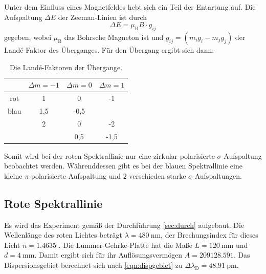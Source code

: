   \noindent
  Unter dem Einfluss eines Magnetfeldes hebt sich ein Teil der Entartung auf. Die Aufspaltung $\Delta E$ der Zeeman-Linien ist durch 
  \begin{equation*}
    \Delta E = \mu_\text{B} B \cdot g_{ij}
  \end{equation*}
  gegeben, wobei $\mu_\text{B}$ das Bohrsche Magneton ist und $g_{ij} = \left(m_ig_i - m_jg_j\right)$ der Land\'{e}-Faktor des Überganges. 
  Für den Übergang ergibt sich dann:
  \begin{table}[H]
    \centering
    \caption{Die Land\'{e}-Faktoren der Übergange.}
    \begin{tabular}{c | c c c }
      \toprule
      {} & {$\Delta m = \num{-1}$} & {$\Delta m = \num{0}$} & {$\Delta m = \num{1}$}\\
      \midrule
      rot & 1 & 0 & -1 \\
      blau & 1,5 & -0,5 & \\
      & 2 & 0 & -2 \\
      &  & 0,5 &-1,5 \\ 
      \bottomrule            
    \end{tabular}
  \end{table}

  \noindent
  Somit wird bei der roten Spektrallinie nur eine zirkular polarisierte $\sigma$-Aufspaltung beobachtet werden. 
  Währenddessen gibt es bei der blauen Spektrallinie eine kleine $\pi$-polarisierte Aufspaltung und $\num{2}$ verschieden starke $\sigma$-Aufspaltungen. 

\subsection{Rote Spektrallinie}

  \noindent Es wird das Experiment gemäß der Durchführung \ref{sec:durch} aufgebaut. Die Wellenlänge des roten Lichtes beträgt 
  $\lambda = \SI{480}{\nano\metre}$, der Brechungsindex für dieses Licht $n = \num{1.4635}$ \cite{V27}. Die Lummer-Gehrke-Platte hat die 
  Maße $L = \SI{120}{\milli\metre}$ und $d = \SI{4}{\milli\metre}$. Damit ergibt sich für ihr Auflösungsvermögen $ A = \num{209128.591}$. 
  Das Dispersionsgebiet berechnet sich nach \eqref{eqn:dispgebiet} zu $\Delta \lambda_\text{D} = \SI{48.91}{\pico\metre}$. \\ 

